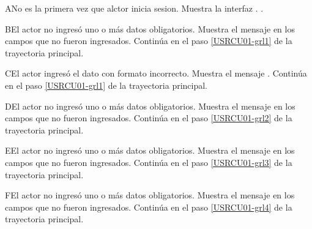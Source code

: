 \begin{UCtrayectoriaA}{A}{No es la primera vez que alctor inicia sesion.}
	\UCpaso [\UCsist] Muestra la interfaz .
	.
\end{UCtrayectoriaA} 

\begin{UCtrayectoriaA}{B}{El actor no ingresó uno o más datos obligatorios.}
	\UCpaso [\UCsist] Muestra el mensaje  en los campos que no
	fueron ingresados.
	\UCpaso [\UCsist] Continúa en el paso \ref{USRCU01-grl1} de la trayectoria principal.
\end{UCtrayectoriaA} 

\begin{UCtrayectoriaA}{C}{El actor ingresó el dato con formato incorrecto.}
	\UCpaso [\UCsist] Muestra el mensaje .
	\UCpaso [\UCsist] Continúa en el paso \ref{USRCU01-grl1} de la trayectoria principal.
\end{UCtrayectoriaA}

\begin{UCtrayectoriaA}{D}{El actor no ingresó uno o más datos obligatorios.}
	\UCpaso [\UCsist] Muestra el mensaje  en los campos que no
	fueron ingresados.
	\UCpaso [\UCsist] Continúa en el paso \ref{USRCU01-grl2} de la trayectoria principal.
\end{UCtrayectoriaA} 

\begin{UCtrayectoriaA}{E}{El actor no ingresó uno o más datos obligatorios.}
	\UCpaso [\UCsist] Muestra el mensaje  en los campos que no
	fueron ingresados.
	\UCpaso [\UCsist] Continúa en el paso \ref{USRCU01-grl3} de la trayectoria principal.
\end{UCtrayectoriaA} 

\begin{UCtrayectoriaA}{F}{El actor no ingresó uno o más datos obligatorios.}
	\UCpaso [\UCsist] Muestra el mensaje  en los campos que no
	fueron ingresados.
	\UCpaso [\UCsist] Continúa en el paso \ref{USRCU01-grl4} de la trayectoria principal.
\end{UCtrayectoriaA} 

